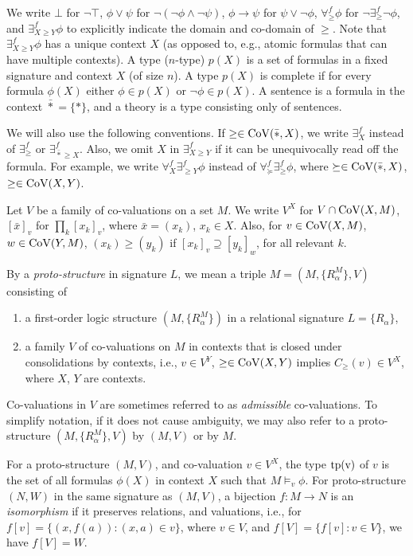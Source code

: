 \documentclass[12pt]{amsart}
\theoremstyle{plain}
\newcommand \Val{{\rm{CoV}}}
\newcommand \tp{\rm{tp}}
\newcommand \fr{\scriptscriptstyle{f}}
\begin{document}
We write $\bot$ for $\neg \top$, $\phi \lor \psi$ for $\neg (\neg \phi \land \neg \psi)$, $\phi \rightarrow \psi$ for $\psi \lor \neg \phi$, $\forall^{\fr}_{\geq} \phi$ for $\neg \exists^{\fr}_\geq \neg \phi$, and $\exists^{\fr}_{X\geq Y} \phi$ to explicitly indicate the domain and co-domain of $\geq$.  Note that $\exists^{\fr}_{X\geq Y} \phi$ has a unique context $X$ (as opposed to, e.g., atomic formulas that can have multiple contexts). A type ($n$-type) $p(X)$ is a set of formulas in a fixed signature and context $X$ (of size $n$). A type $p(X)$ is complete if for every formula $\phi(X)$ either $\phi \in p(X)$ or $\neg \phi \in p(X)$. A sentence is a formula in the context $\bar{*}=\{*\}$, and a theory is a type consisting only of sentences.
	
We will also use the following conventions. If $\geq \in \Val(\bar{*},X)$, we write $\exists^{\fr}_X$ instead of $\exists^{\fr}_{\geq}$ or $\exists^{\fr}_{\bar{*} \geq X}$. Also, we omit $X$ in $\exists^{\fr}_{X\geq Y}$ if it can be unequivocally read off the formula. For example, we write $\forall^{\fr}_X \exists^{\fr}_{\geq Y} \phi$ instead of $\forall^{\fr}_{\succeq} \exists^{\fr}_{\geq} \phi$, where $\succeq \in \Val(\bar{*},X)$, $\geq \in \Val(X,Y)$.

Let $V$ be a family of co-valuations on a set $M$. We write  $V^X$ for $V \cap \Val(X,M)$, $[\bar{x}]_v$ for $\prod_k [x_k]_v$, where $\bar{x}=(x_k)$,  $x_k \in X$. Also, for $v \in \Val(X,M)$, $w \in \Val(Y,M)$, $(x_k) \geq (y_k)$ if $[x_k]_v \supseteq [ y_k]_w$, for all relevant $k$. 
	
By a \emph{proto-structure} in signature $L$,  we mean a triple $M = (M,\{R^M_\alpha\},V)$ consisting of
	
	\begin{enumerate}
		\item a first-order logic structure $(M,\{R^M_\alpha\})$ in a relational signature $L=\{R_\alpha\}$,
		\item a family $V$ of co-valuations on $M$ in contexts that is closed under  consolidations by contexts, i.e., $v \in V^Y$, $\geq \in \Val(X,Y)$ implies $C_{\geq}(v) \in V^X$, where $X$, $Y$ are contexts.
	\end{enumerate}
	Co-valuations in $V$ are sometimes referred to as \emph{admissible} co-valuations. To simplify notation, if it does not cause ambiguity, we may also refer to a proto-structure $(M,\{R^M_\alpha\},V)$ by $(M,V)$ or  by $M$.
	
	For a proto-structure $(M,V)$, and co-valuation $v \in V^X$, the type $\tp(v)$ of $v$ is the set of all formulas $\phi(X)$ in context $X$ such that  $M \models_v \phi$. For proto-structure $(N,W)$ in the same signature as $(M,V)$, a bijection $f:M \to N$ is an \emph{isomorphism} if it preserves relations, and valuations, i.e., for $f[v]=\{(x,f(a)): (x,a) \in v \}$, where $v \in V$, and $f[V]=\{f[v]: v \in V\}$, we have $f[V]=W$.
	
\end{document}
